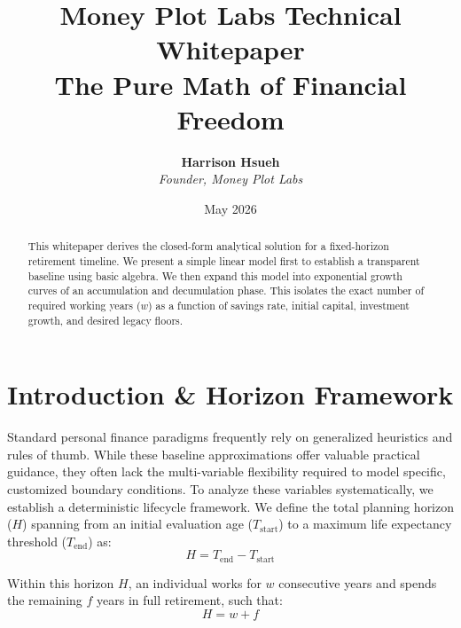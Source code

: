 \documentclass[11pt,letterpaper]{article}
\title{\vspace{-20pt}\textbf{\color{mpdark}Money Plot Labs Technical Whitepaper \\ The Pure Math of Financial Freedom}}
\author{\textbf{Harrison Hsueh} \\ \textit{Founder, Money Plot Labs}}
\date{May 2026}
\begin{document}
\maketitle

\begin{abstract}
\vspace{-5pt}
This whitepaper derives the closed-form analytical solution for a fixed-horizon retirement timeline. We present a simple linear model first to establish a transparent baseline using basic algebra. We then expand this model into exponential growth curves of an accumulation and decumulation phase. This isolates the exact number of required working years ($w$) as a function of savings rate, initial capital, investment growth, and desired legacy floors.
\end{abstract}

\section{Introduction \& Horizon Framework}
Standard personal finance paradigms frequently rely on generalized heuristics and rules of thumb. While these baseline approximations offer valuable practical guidance, they often lack the multi-variable flexibility required to model specific, customized boundary conditions. To analyze these variables systematically, we establish a deterministic lifecycle framework. We define the total planning horizon ($H$) spanning from an initial evaluation age ($T_{\text{start}}$) to a maximum life expectancy threshold ($T_{\text{end}}$) as:
\begin{equation}
H = T_{\text{end}} - T_{\text{start}}
\end{equation}

Within this horizon $H$, an individual works for $w$ consecutive years and spends the remaining $f$ years in full retirement, such that:
\begin{equation}
H = w + f
\end{equation}
\end{document}
